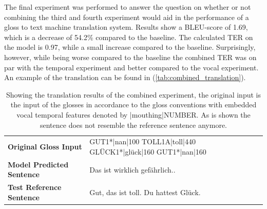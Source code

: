 
The final experiment was performed to answer the question on whether or not combining the third and fourth experiment would aid in the performance of a gloss to text machine translation system. Results show a BLEU-score of 1.69, which is a decrease of 54.2\% compared to the baseline. The calculated TER on the model is 0.97, while a small increase compared to the baseline. Surprisingly, however, while being worse compared to the baseline the combined TER was on par with the temporal experiment and better compared to the vocal experiment. An example of the translation can be found in (\autoref{tab:combined_translation}).
\begin{table}[h]
\centering
\caption{Showing the translation results of the combined experiment, the original input is the input of the glosses in accordance to the gloss conventions with embedded vocal temporal features denoted by |mouthing|NUMBER. As is shown the sentence does not resemble the reference sentence anymore.}

\begin{tabular}{ll}
\textbf{Original Gloss Input}     & GUT1*|nan|100 TOLL1A|toll|440 GLÜCK1*|glück|160 GUT1*|nan|160 \\
\textbf{Model Predicted Sentence} & Das ist wirklich gefährlich..                                                                                     \\
\textbf{Test Reference Sentence}  & Gut, das ist toll. Du hattest Glück.                                                

\end{tabular}
\bottomrule
\label{tab:combined_translation}
\end{table}



\mydata

